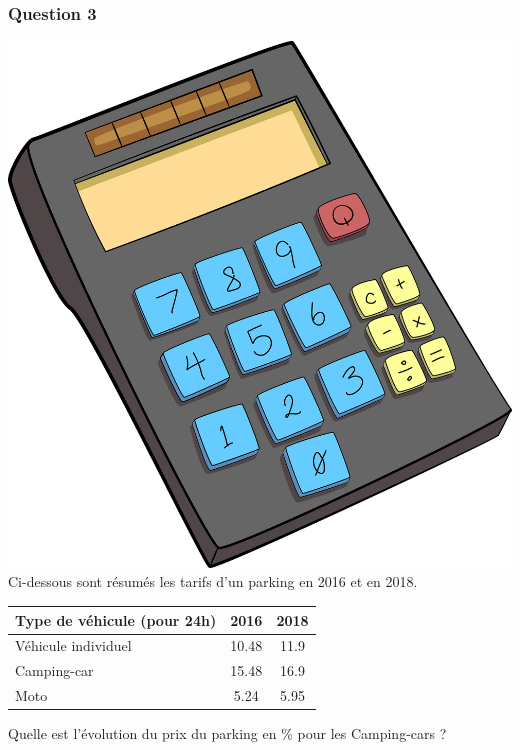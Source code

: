 \documentclass[15pt, mathserif]{beamer}
\begin{document}
\begin{frame} 
	\frametitle{Question 3}
\includegraphics[scale=0.01]{calculatrice}Ci-dessous sont résumés les tarifs d'un parking en 2016 et en 2018. 
 \begin{center} 
 \begin{tabular}{|C{3cm}|c|c|} 
 \hline 
 Type de véhicule (pour 24h) & 2016 & 2018 \\ 
 \hline 
 Véhicule individuel & 10.48& 11.9\\ 
 \hline 
 Camping-car & 15.48& 16.9\\ 
 \hline 
 Moto & 5.24& 5.95\\ 
 \hline 
 \end{tabular} 
\end{center} 
  Quelle est l'évolution du prix du parking en \% pour les Camping-cars ?\end{frame}
\end{document}
